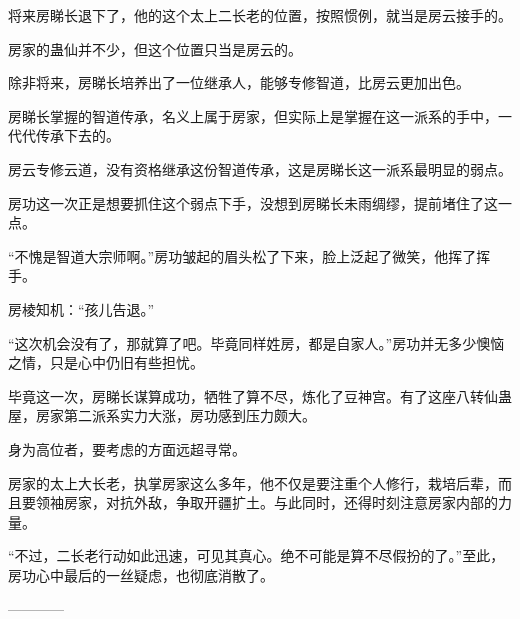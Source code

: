 \begin{this_body}
将来房睇长退下了，他的这个太上二长老的位置，按照惯例，就当是房云接手的。

房家的蛊仙并不少，但这个位置只当是房云的。

除非将来，房睇长培养出了一位继承人，能够专修智道，比房云更加出色。

房睇长掌握的智道传承，名义上属于房家，但实际上是掌握在这一派系的手中，一代代传承下去的。

房云专修云道，没有资格继承这份智道传承，这是房睇长这一派系最明显的弱点。

房功这一次正是想要抓住这个弱点下手，没想到房睇长未雨绸缪，提前堵住了这一点。

“不愧是智道大宗师啊。”房功皱起的眉头松了下来，脸上泛起了微笑，他挥了挥手。

房棱知机：“孩儿告退。”

“这次机会没有了，那就算了吧。毕竟同样姓房，都是自家人。”房功并无多少懊恼之情，只是心中仍旧有些担忧。

毕竟这一次，房睇长谋算成功，牺牲了算不尽，炼化了豆神宫。有了这座八转仙蛊屋，房家第二派系实力大涨，房功感到压力颇大。

身为高位者，要考虑的方面远超寻常。

房家的太上大长老，执掌房家这么多年，他不仅是要注重个人修行，栽培后辈，而且要领袖房家，对抗外敌，争取开疆扩土。与此同时，还得时刻注意房家内部的力量。

“不过，二长老行动如此迅速，可见其真心。绝不可能是算不尽假扮的了。”至此，房功心中最后的一丝疑虑，也彻底消散了。

------------

\end{this_body}

